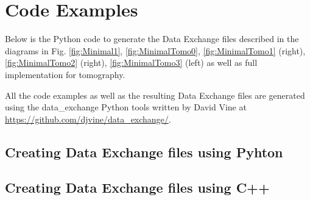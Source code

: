 \section{Code Examples}


Below is the Python code to generate the Data Exchange files described in the diagrams in Fig.  \ref{fig:Minimal1}, \ref{fig:MinimalTomo0}, \ref{fig:MinimalTomo1} (right), \ref{fig:MinimalTomo2} (right), \ref{fig:MinimalTomo3} (left) as well as full implementation for tomography.


All the code examples as well as the resulting Data Exchange files are generated using the data\_exchange Python tools written by David Vine at  \url{https://github.com/djvine/data_exchange/}.

\hypersetup{linkcolor = white}
 
\newpage
\subsection{Creating Data Exchange files using Pyhton}




\newpage
{}


\newpage
{}


\newpage
{}


\newpage
{}


\newpage
{}


\newpage
{}


\hypersetup{linkcolor = softBlue}

\subsection{Creating Data Exchange files using C++}

